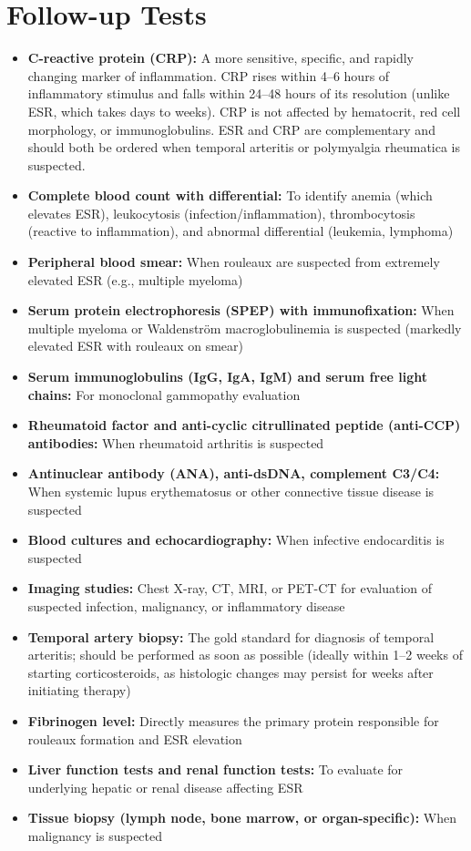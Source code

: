 \section*{Follow-up Tests}
\begin{itemize}
  \item \textbf{C-reactive protein (CRP):} A more sensitive, specific, and rapidly changing marker of inflammation. CRP rises within 4--6 hours of inflammatory stimulus and falls within 24--48 hours of its resolution (unlike ESR, which takes days to weeks). CRP is not affected by hematocrit, red cell morphology, or immunoglobulins. ESR and CRP are complementary and should both be ordered when temporal arteritis or polymyalgia rheumatica is suspected.
  \item \textbf{Complete blood count with differential:} To identify anemia (which elevates ESR), leukocytosis (infection/inflammation), thrombocytosis (reactive to inflammation), and abnormal differential (leukemia, lymphoma)
  \item \textbf{Peripheral blood smear:} When rouleaux are suspected from extremely elevated ESR (e.g., multiple myeloma)
  \item \textbf{Serum protein electrophoresis (SPEP) with immunofixation:} When multiple myeloma or Waldenstr\"{o}m macroglobulinemia is suspected (markedly elevated ESR with rouleaux on smear)
  \item \textbf{Serum immunoglobulins (IgG, IgA, IgM) and serum free light chains:} For monoclonal gammopathy evaluation
  \item \textbf{Rheumatoid factor and anti-cyclic citrullinated peptide (anti-CCP) antibodies:} When rheumatoid arthritis is suspected
  \item \textbf{Antinuclear antibody (ANA), anti-dsDNA, complement C3/C4:} When systemic lupus erythematosus or other connective tissue disease is suspected
  \item \textbf{Blood cultures and echocardiography:} When infective endocarditis is suspected
  \item \textbf{Imaging studies:} Chest X-ray, CT, MRI, or PET-CT for evaluation of suspected infection, malignancy, or inflammatory disease
  \item \textbf{Temporal artery biopsy:} The gold standard for diagnosis of temporal arteritis; should be performed as soon as possible (ideally within 1--2 weeks of starting corticosteroids, as histologic changes may persist for weeks after initiating therapy)
  \item \textbf{Fibrinogen level:} Directly measures the primary protein responsible for rouleaux formation and ESR elevation
  \item \textbf{Liver function tests and renal function tests:} To evaluate for underlying hepatic or renal disease affecting ESR
  \item \textbf{Tissue biopsy (lymph node, bone marrow, or organ-specific):} When malignancy is suspected
\end{itemize}

